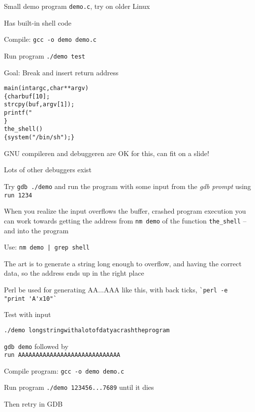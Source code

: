 \documentclass[Screen16to9,17pt]{foils}
\begin{document}


\begin{list2}
\item Small demo program \verb+demo.c+, try on older Linux
\item Has built-in shell code
\item Compile:
\verb+gcc -o demo demo.c+
\item Run program
\verb+./demo test+
\item Goal: Break and insert return address
\end{list2}

\begin{alltt}\small
main(int argc, char **argv)
\{      char buf[10];
        strcpy(buf, argv[1]);
        printf("%s\textbackslash{}n",buf);
\}
the_shell()
\{  system("/bin/sh");  \}
\end{alltt}



\begin{list1}
\item GNU compileren and debuggeren are OK for this, can fit on a slide!
\item Lots of other debuggers exist
\item Try \verb+gdb ./demo+ and run the program with some input from the \emph{gdb prompt}
using \verb+run 1234+
\item When you realize the input overflows the buffer, crashed program execution you can work towards getting the address from \verb+nm demo+ of the function \verb+the_shell+
   -- and into the program
\item Use: \verb+nm demo | grep shell+
\item The art is to generate a string long enough to overflow, and having the correct data, so the address ends up in the right place
\item Perl be used for generating AA...AAA like this, with back ticks, \verb+`perl -e "print 'A'x10"`+
\end{list1}



\begin{list1}
\item Test with input
\begin{list2}
\item \verb+./demo longstringwithalotofdatyacrashtheprogram+
\item \verb+gdb demo+ followed by\\
\verb+run AAAAAAAAAAAAAAAAAAAAAAAAAAAAA+

\item Compile program: \verb+gcc -o demo demo.c+
\item Run program \verb+./demo 123456...7689+ until it dies
\item Then retry in GDB
\end{list2}
\end{list1}
\end{document}
